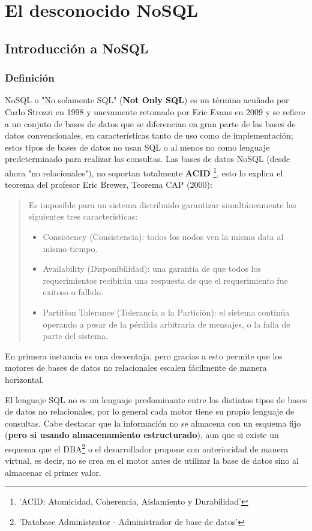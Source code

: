 \part{El desconocido NoSQL} 
\chapter{Introducci\'on a NoSQL}

\section{Definici\'on}

NoSQL o "No solamente SQL" ({\bf Not Only SQL}) es un t\'ermino acu\~nado por Carlo Strozzi en 1998 y nuevamente retomado por Eric Evans en 2009 y se refiere a un conjuto de bases de datos que se diferencian en gran parte de las bases de datos convencionales, en caracter\'isticas tanto de uso como de implementaci\'on; estos tipos de bases de datos no usan SQL o al menos no como lenguaje predeterminado para realizar las consultas. Las bases de datos NoSQL (desde ahora "no relacionales"), no soportan totalmente {\bf ACID} \footnote{'ACID: Atomicidad, Coherencia, Aislamiento y Durabilidad'}, esto lo explica el teorema del profesor Eric Brewer, Teorema CAP (2000):

\begin{quote}
Es imposible para un sistema distribuido garantizar simultáneamente las siguientes tres características:

	\begin{itemize}
		\item Consistency (Consistencia): todos los nodos ven la misma data al mismo tiempo.
		\item Availability (Disponibilidad): una garantía de que todos los requerimientos recibirán una respuesta de que el requerimiento fue exitoso o fallido.
		\item Partition Tolerance (Tolerancia a la Partición): el sistema continúa operando a pesar de la pérdida arbitraria de mensajes, o la falla de parte del sistema.
	\end{itemize}
\end{quote}

En primera instancia es una desventaja, pero gracias a esto permite que los motores de bases de datos no relacionales escalen f\'acilmente de manera horizontal. 

El lenguaje SQL no es un lenguaje predominante entre los distintos tipos de bases de datos no relacionales, por lo general cada motor tiene su propio lenguaje de consultas. Cabe destacar que la informaci\'on no se almacena con un esquema fijo (\textbf{pero si usando almacenamiento estructurado}), aun que si existe un esquema que el DBA\footnote{'Database Administrator - Administrador de base de datos'} o el desarrollador propone con anterioridad de manera virtual, es decir, no se crea en el motor antes de utilizar la base de datos sino al almacenar el primer valor.


